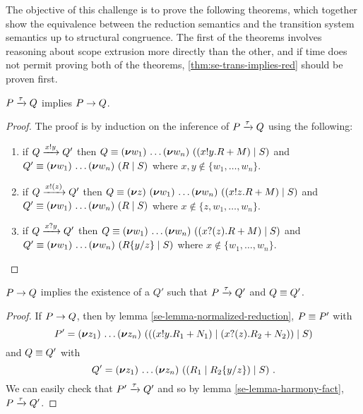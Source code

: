 The objective of this challenge is to prove the following theorems, which together show the equivalence between the reduction semantics and the transition system semantics up to structural congruence.
The first of the theorems involves reasoning about scope extrusion more directly than the other, and if time does not permit proving both of the theorems, \autoref{thm:se-trans-implies-red} should be proven first.
\begin{theorem}\label{thm:se-trans-implies-red}
  \( P \xrightarrow{\tau} Q \) implies \( P \rightarrow Q \).
\end{theorem}
\begin{proof}
  The proof is by induction on the inference of \( P \xrightarrow{\tau} Q \) using the following:
  \begin{enumerate}
  \item if \( Q \xrightarrow{x ! y} Q' \) then \( Q \equiv (\bm{\nu} w_1)~\!\dots (\bm{\nu} w_n)~((x ! y . R + M) \mid S) \) and \( Q' \equiv (\bm{\nu} w_1)~\!\dots (\bm{\nu} w_n)~(R \mid S) \) where \( x,y \notin \{ w_1, \dots, w_n \} \).
  \item if \( Q \xrightarrow{x ! (z)} Q' \) then \( Q \equiv (\bm{\nu} z)~(\bm{\nu} w_1)~\!\dots (\bm{\nu} w_n)~((x ! z . R + M) \mid S) \) and \( Q' \equiv (\bm{\nu} w_1)~\!\dots (\bm{\nu} w_n)~(R \mid S) \) where \( x \notin \{ z, w_1, \dots, w_n \} \).
  \item if \( Q \xrightarrow{x ? y} Q' \) then \( Q \equiv (\bm{\nu} w_1)~\!\dots (\bm{\nu} w_n)~((x ? (z) . R + M) \mid S) \) and \( Q' \equiv (\bm{\nu} w_1)~\!\dots (\bm{\nu} w_n)~(R\{y/z\} \mid S) \) where \( x \notin \{ w_1, \dots, w_n \} \).
  \end{enumerate}
\end{proof}

\begin{theorem}
  \( P \rightarrow Q \) implies the existence of a \( Q' \) such that \( P \xrightarrow{\tau} Q' \) and \( Q \equiv Q' \).
\end{theorem}
\begin{proof}
  If \( P \rightarrow Q \), then by lemma \autoref{se-lemma-normalized-reduction}, \( P \equiv P' \) with
  \begin{equation*}
    P' = (\bm{\nu} z_1)~\!\dots (\bm{\nu} z_n)~(((x ! y . R_1 + N_1) \mid (x ? (z) . R_2 + N_2)) \mid S)
  \end{equation*}
  and \( Q \equiv Q' \) with
  \begin{equation*}
    Q' = (\bm{\nu} z_1)~\!\dots (\bm{\nu} z_n)~((R_1 \mid R_2\{y/z\}) \mid S) \ .
  \end{equation*}
  We can easily check that \( P' \xrightarrow{\tau} Q' \) and so by lemma \autoref{se-lemma-harmony-fact}, \( P \xrightarrow{\tau} Q' \).
\end{proof}
